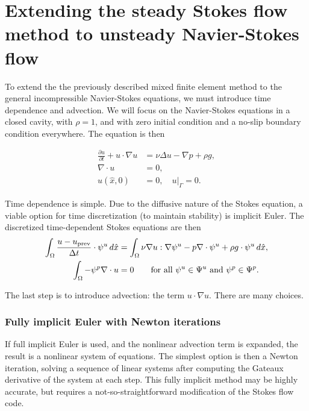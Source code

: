 \section{Extending the steady Stokes flow method to unsteady Navier-Stokes flow}

To extend the the previously described mixed finite element method to the general incompressible Navier-Stokes equations,
we must introduce time dependence and advection. We will focus on the Navier-Stokes equations in a closed cavity, with $\rho = 1$, and with zero initial condition and
a no-slip boundary condition everywhere. The equation is then

\begin{equation}\label{navier_stokes_ibvp}
\begin{split}
    \frac{\partial u}{\partial t} + u\cdot\nabla u &= \nu\Delta u - \nabla p + \rho g,\\
    \nabla\cdot u &= 0,\\
    u(\hat{x}, 0) &= 0, \quad \left.u\right|_\Gamma = 0.
\end{split}
\end{equation}

Time dependence is simple. Due to the diffusive nature of the Stokes equation, a viable option for time discretization (to maintain stability) is implicit Euler.
The discretized time-dependent Stokes equations are then
\newcommand{\uprev}{{u_{\text{prev}}}}
\begin{equation}
\begin{split}
    \int_\om \frac{u - \uprev}{\Delta t}\cdot \psi^u\,d\hat{x}
        &= \int_\om \nu \nabla u : \nabla \psi^u - p\nabla\cdot \psi^u + \rho g \cdot \psi^u\,d\hat{x},\\
    \int_\om -\psi^p \nabla\cdot u &= 0 \text{\quad\quad for all $\psi^u \in \Psi^u$ and $\psi^p \in \Psi^p$.}
\end{split}
\end{equation}

The last step is to introduce advection: the term $u\cdot \nabla u$. There are many choices.
\subsubsection{Fully implicit Euler with Newton iterations}
If full implicit Euler is used, and the nonlinear advection term is expanded, the result is a nonlinear system of equations.
The simplest option is then a Newton iteration, solving a sequence of linear systems after computing the Gateaux derivative of the system
at each step. This fully implicit method may be highly accurate, but requires a not-so-straightforward modification of the Stokes flow code.

